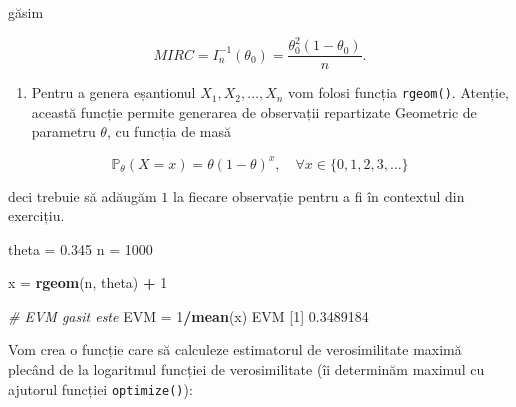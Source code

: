 \documentclass[]{article}
\newenvironment{Shaded}{\begin{snugshade}}{\end{snugshade}}
\newcommand{\KeywordTok}[1]{\textcolor[rgb]{0.13,0.29,0.53}{\textbf{#1}}}
\newcommand{\DecValTok}[1]{\textcolor[rgb]{0.00,0.00,0.81}{#1}}
\newcommand{\FloatTok}[1]{\textcolor[rgb]{0.00,0.00,0.81}{#1}}
\newcommand{\StringTok}[1]{\textcolor[rgb]{0.31,0.60,0.02}{#1}}
\newcommand{\CommentTok}[1]{\textcolor[rgb]{0.56,0.35,0.01}{\textit{#1}}}
\newcommand{\OperatorTok}[1]{\textcolor[rgb]{0.81,0.36,0.00}{\textbf{#1}}}
\newcommand{\NormalTok}[1]{#1}
\providecommand{\tightlist}{%
  \setlength{\itemsep}{0pt}\setlength{\parskip}{0pt}}
\begin{document}
găsim

\[
  MIRC = I_n^{-1}(\theta_0) = \frac{\theta_0^2(1-\theta_0)}{n}.
\]

\begin{enumerate}
\def\labelenumi{\alph{enumi})}
\setcounter{enumi}{6}
\tightlist
\item
  Pentru a genera eșantionul \(X_1, X_2, \ldots, X_n\) vom folosi
  funcția \texttt{rgeom()}. Atenție, această funcție permite generarea
  de observații repartizate Geometric de parametru \(\theta\), cu
  funcția de masă
\end{enumerate}

\[
 \mathbb{P}_{\theta}(X = x) = \theta (1-\theta)^{x}, \quad \forall x\in\{0,1,2,3,\ldots\}  
\]

deci trebuie să adăugăm \(1\) la fiecare observație pentru a fi în
contextul din exercițiu.

\begin{Shaded}
\begin{Highlighting}[]
\NormalTok{theta =}\StringTok{ }\FloatTok{0.345}
\NormalTok{n =}\StringTok{ }\DecValTok{1000}

\NormalTok{x =}\StringTok{ }\KeywordTok{rgeom}\NormalTok{(n, theta) }\OperatorTok{+}\StringTok{ }\DecValTok{1}

\CommentTok{# EVM gasit este }
\NormalTok{EVM =}\StringTok{ }\DecValTok{1}\OperatorTok{/}\KeywordTok{mean}\NormalTok{(x)}
\NormalTok{EVM}
\NormalTok{[}\DecValTok{1}\NormalTok{] }\FloatTok{0.3489184}
\end{Highlighting}
\end{Shaded}

Vom crea o funcție care să calculeze estimatorul de verosimilitate
maximă plecând de la logaritmul funcției de verosimilitate (îi
determinăm maximul cu ajutorul funcției \texttt{optimize()}):
\end{document}
